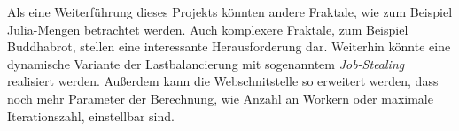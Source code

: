 Als eine Weiterführung dieses Projekts könnten andere Fraktale, wie zum Beispiel Julia-Mengen betrachtet werden.
Auch komplexere Fraktale, zum Beispiel Buddhabrot, stellen eine interessante Herausforderung dar.
Weiterhin könnte eine dynamische Variante der Lastbalancierung mit sogenanntem \textit{Job-Stealing} realisiert werden.
Außerdem kann die Webschnitstelle so erweitert werden, dass noch mehr Parameter der Berechnung, wie Anzahl an Workern oder maximale Iterationszahl, einstellbar sind.